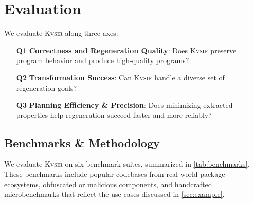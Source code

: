 \documentclass[sigplan]{acmart}
\newcommand{\sys}{{\scshape Kv{\textalpha}sir}\xspace}
\begin{document}
\section{Evaluation}

We evaluate \sys along three axes:

\begin{itemize}
  \item[\textbf{Q1}] \textbf{Correctness and Regeneration Quality}: Does \sys preserve program behavior and produce high-quality programs?
  \item[\textbf{Q2}] \textbf{Transformation Success}: Can \sys handle a diverse set of regeneration goals?
  \item[\textbf{Q3}] \textbf{Planning Efficiency \& Precision}: Does minimizing extracted properties help regeneration succeed faster and more reliably?
\end{itemize}

\subsection{Benchmarks \& Methodology}

We evaluate \sys on six benchmark suites, summarized in \cref{tab:benchmarks}.
These benchmarks include popular codebases from real-world package ecosystems, obfuscated or malicious components, and handcrafted microbenchmarks that reflect the use cases discussed in \cref{sec:example}.
\end{document}
